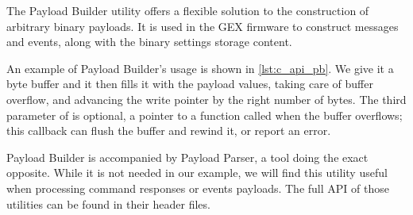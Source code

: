 The Payload Builder utility offers a flexible solution to the construction of arbitrary binary payloads. It is used in the GEX firmware to construct messages and events, along with the binary settings storage content. 

An example of Payload Builder's usage is shown in \cref{lst:c_api_pb}. We give it a byte buffer and it then fills it with the payload values, taking care of buffer overflow, and advancing the write pointer by the right number of bytes. The third parameter of  is optional, a pointer to a function called when the buffer overflows; this callback can flush the buffer and rewind it, or report an error.

Payload Builder is accompanied by Payload Parser, a tool doing the exact opposite. While it is not needed in our example, we will find this utility useful when processing command responses or events payloads. The full \gls{API} of those utilities can be found in their header files.

